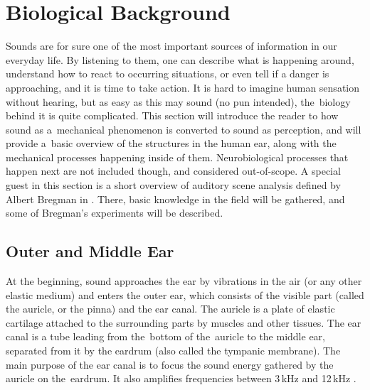\section{Biological Background}\label{chapter:biology}

Sounds are for sure one of the most important sources of information in our everyday life. By listening to them, one can describe what is happening around, understand how to react to occurring situations, or even tell if a danger is approaching, and it is time to take action. It is hard to imagine human sensation without hearing, but as easy as this may sound (no pun intended), the~biology behind it is quite complicated. This section will introduce the reader to how sound as a~mechanical phenomenon is converted to sound as perception, and will provide a~basic overview of the structures in the human ear, along with the mechanical processes happening inside of them. Neurobiological processes that happen next are not included though, and considered out-of-scope. A special guest in this section is a short overview of auditory scene analysis defined by Albert Bregman in \cite{Bregman1990}. There, basic knowledge in the field will be gathered, and some of Bregman's experiments will be described.

\subsection{Outer and Middle Ear}

At the beginning, sound approaches the ear by vibrations in the air (or any other elastic medium) and enters the outer ear, which consists of the visible part (called the auricle, or the pinna) and the ear canal. The auricle is a plate of elastic cartilage attached to the surrounding parts by muscles and other tissues. The ear canal is a tube leading from the~bottom of the~auricle to the middle ear, separated from it by the eardrum (also called the tympanic membrane). The main purpose of the ear canal is to focus the sound energy gathered by the auricle on the~eardrum. It also amplifies frequencies between 3\,kHz and 12\,kHz \cite{Standring2008}.\\

